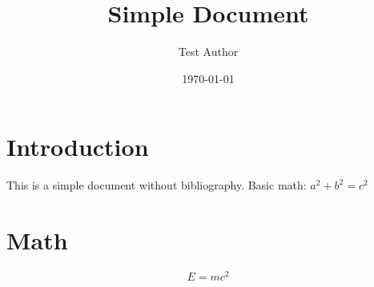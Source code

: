 \documentclass{article}
\title{Simple Document}
\author{Test Author}
\date{\today}
\begin{document}
\maketitle

\section{Introduction}
This is a simple document without bibliography. Basic math: $a^2 + b^2 = c^2$

\section{Math}
\begin{equation}
    E = mc^2
\end{equation}
\end{document}
